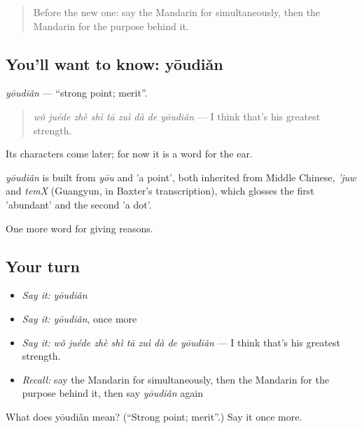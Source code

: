 \label{lesson:ZH-C372-youdian}



\begin{quote}
Before the new one: say the Mandarin for simultaneously, then the Mandarin for the purpose behind it.
\end{quote}

\subsection*{You'll want to know: yōudiǎn}
\emph{yōudiǎn} — \textquotedblleft{}strong point; merit\textquotedblright{}.

\begin{quote}
\emph{wǒ juéde zhè shì tā zuì dà de yōudiǎn} — I think that's his greatest strength.
\end{quote}

Its characters come later; for now it is a word for the ear.

\begin{cousinweb}
\emph{yōudiǎn} is built from \emph{yōu} and  'a point', both inherited from Middle Chinese, \emph{'juw} and \emph{temX} (Guangyun, in Baxter's transcription), which glosses the first 'abundant' and the second 'a dot'.
\end{cousinweb}

\begin{grammarlens}[title={What you've built}]
One more word for giving reasons.
\end{grammarlens}

\subsection*{Your turn}
\begin{itemize}
\raggedright
  \item \emph{Say it:} \emph{yōudiǎn}
  \item \emph{Say it:} \emph{yōudiǎn}, once more
  \item \emph{Say it:} \emph{wǒ juéde zhè shì tā zuì dà de yōudiǎn} — I think that's his greatest strength.
  \item \emph{Recall:} say the Mandarin for simultaneously, then the Mandarin for the purpose behind it, then say \emph{yōudiǎn} again
\end{itemize}

\begin{tcolorbox}[breakable,colback=teal!4,colframe=teal!35!black,title={Before you move on}]
What does yōudiǎn mean? (\textquotedblleft{}Strong point; merit\textquotedblright{}.) Say it once more.
\end{tcolorbox}

